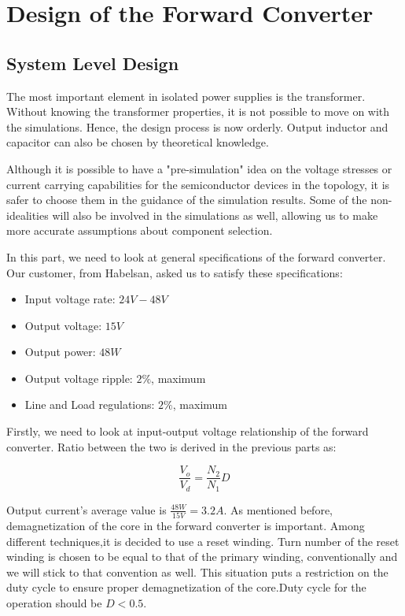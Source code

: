 \section{Design of the Forward Converter}
\subsection{System Level Design}

The most important element in isolated power supplies is the transformer. Without knowing the transformer properties, it is not possible to move on with the simulations. Hence, the design process is now orderly. Output inductor and capacitor can also be chosen by theoretical knowledge.

Although it is possible to have a "pre-simulation" idea on the voltage stresses or current carrying capabilities for the semiconductor devices in the topology, it is safer to choose them in the guidance of the simulation results. Some of the non-idealities will also be involved in the simulations as well, allowing us to make more accurate assumptions about component selection. 

In this part, we need to look at general specifications of the forward converter. Our customer, from Habelsan, asked us to  satisfy these specifications:

\begin{itemize}
    \item Input voltage rate: $24V-48V$
    \item Output voltage: $15V$
    \item Output power: $48W$
    \item Output voltage ripple: $2\%$, maximum
    \item Line and Load regulations: $2\%$, maximum
\end{itemize}

Firstly, we need to look at input-output voltage relationship of the forward converter. Ratio between the two is derived in the previous parts as:

\begin{equation}
    \frac{V_o}{V_d} = \frac{N_2}{N_1}D
\end{equation}

Output current's average value is $\frac{48W}{15V} = 3.2A$. As mentioned before, demagnetization of the core in the forward converter is important. Among different techniques,it is decided to use a reset winding. Turn number of the reset winding is chosen to be equal to that of the primary winding, conventionally and we will stick to that convention as well. This situation puts a restriction on the duty cycle to ensure proper demagnetization of the core.Duty cycle for the operation should be $D < 0.5$.

